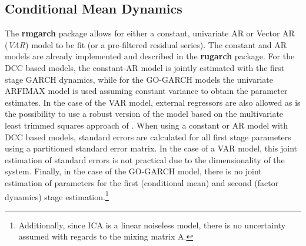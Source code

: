\subsection{Conditional Mean Dynamics}\label{section:mmean}
The {\bf rmgarch} package allows for either a constant, univariate AR or
Vector AR (\emph{VAR}) model to be fit (or a pre-filtered residual series).
The constant and AR models are already implemented and described in the {\bf {rugarch}}
package. For the DCC based models, the constant-AR model is jointly estimated
with the first stage GARCH dynamics, while for the GO-GARCH models the univariate
ARFIMAX model is used assuming constant variance to obtain the parameter estimates.
In the case of the VAR model, external regressors are also allowed as is the
possibility to use a robust version of the model based on the multivariate least
trimmed squares approach of \cite{Croux2008}. When using a constant or AR model
with DCC based models, standard errors are calculated for all first stage
parameters using a partitioned standard error matrix. In the case of a VAR model,
this joint estimation of standard errors is not practical due to the dimensionality
of the system. Finally, in the case of the GO-GARCH model, there is no joint
estimation of parameters for the first (conditional mean) and second (factor dynamics)
stage estimation.\footnote{
Additionally, since ICA is a linear noiseless model, there is no uncertainty assumed
with regards to the mixing matrix A.}
